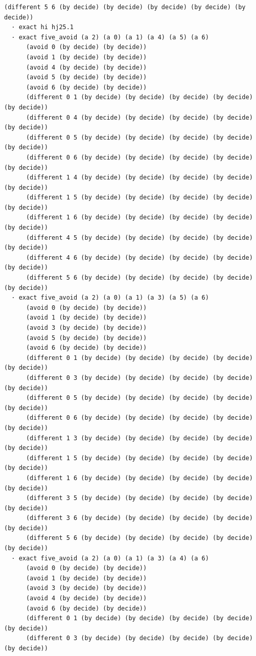 \documentclass[11pt,a4paper]{article}
\begin{document}
\begin{Verbatim}[breaklines,breakanywhere,fontsize=\footnotesize]
      (different 5 6 (by decide) (by decide) (by decide) (by decide) (by decide))
  · exact hi hj25.1
  · exact five_avoid (a 2) (a 0) (a 1) (a 4) (a 5) (a 6)
      (avoid 0 (by decide) (by decide))
      (avoid 1 (by decide) (by decide))
      (avoid 4 (by decide) (by decide))
      (avoid 5 (by decide) (by decide))
      (avoid 6 (by decide) (by decide))
      (different 0 1 (by decide) (by decide) (by decide) (by decide) (by decide))
      (different 0 4 (by decide) (by decide) (by decide) (by decide) (by decide))
      (different 0 5 (by decide) (by decide) (by decide) (by decide) (by decide))
      (different 0 6 (by decide) (by decide) (by decide) (by decide) (by decide))
      (different 1 4 (by decide) (by decide) (by decide) (by decide) (by decide))
      (different 1 5 (by decide) (by decide) (by decide) (by decide) (by decide))
      (different 1 6 (by decide) (by decide) (by decide) (by decide) (by decide))
      (different 4 5 (by decide) (by decide) (by decide) (by decide) (by decide))
      (different 4 6 (by decide) (by decide) (by decide) (by decide) (by decide))
      (different 5 6 (by decide) (by decide) (by decide) (by decide) (by decide))
  · exact five_avoid (a 2) (a 0) (a 1) (a 3) (a 5) (a 6)
      (avoid 0 (by decide) (by decide))
      (avoid 1 (by decide) (by decide))
      (avoid 3 (by decide) (by decide))
      (avoid 5 (by decide) (by decide))
      (avoid 6 (by decide) (by decide))
      (different 0 1 (by decide) (by decide) (by decide) (by decide) (by decide))
      (different 0 3 (by decide) (by decide) (by decide) (by decide) (by decide))
      (different 0 5 (by decide) (by decide) (by decide) (by decide) (by decide))
      (different 0 6 (by decide) (by decide) (by decide) (by decide) (by decide))
      (different 1 3 (by decide) (by decide) (by decide) (by decide) (by decide))
      (different 1 5 (by decide) (by decide) (by decide) (by decide) (by decide))
      (different 1 6 (by decide) (by decide) (by decide) (by decide) (by decide))
      (different 3 5 (by decide) (by decide) (by decide) (by decide) (by decide))
      (different 3 6 (by decide) (by decide) (by decide) (by decide) (by decide))
      (different 5 6 (by decide) (by decide) (by decide) (by decide) (by decide))
  · exact five_avoid (a 2) (a 0) (a 1) (a 3) (a 4) (a 6)
      (avoid 0 (by decide) (by decide))
      (avoid 1 (by decide) (by decide))
      (avoid 3 (by decide) (by decide))
      (avoid 4 (by decide) (by decide))
      (avoid 6 (by decide) (by decide))
      (different 0 1 (by decide) (by decide) (by decide) (by decide) (by decide))
      (different 0 3 (by decide) (by decide) (by decide) (by decide) (by decide))

\end{Verbatim}
\end{document}
